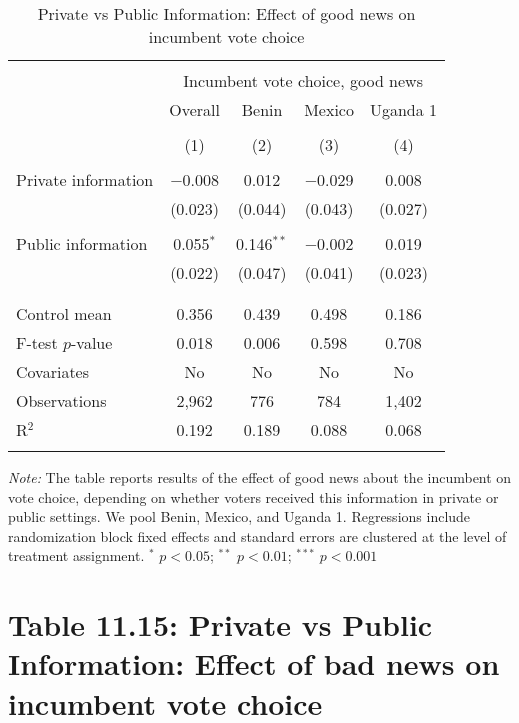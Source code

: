 \documentclass[]{article}
\begin{document}
\begin{table}[htb] \centering 
  \caption{Private vs Public Information: Effect of good news on incumbent vote choice} 
  \label{pvt_pub_good} 
\begin{tabular}{@{\extracolsep{5pt}}lcccc} 
\\[-1.8ex]\hline 
\hline \\[-1.8ex] 
 & \multicolumn{4}{c}{Incumbent vote choice, good news} \\ 
\cline{2-5} 
 & Overall & Benin & Mexico & Uganda 1 \\ 
\\[-1.8ex] & (1) & (2) & (3) & (4)\\ 
\hline \\[-1.8ex] 
 Private information & $-$0.008 & 0.012 & $-$0.029 & 0.008 \\ 
  & (0.023) & (0.044) & (0.043) & (0.027) \\ 
  & & & & \\ 
 Public information & 0.055$^{*}$ & 0.146$^{**}$ & $-$0.002 & 0.019 \\ 
  & (0.022) & (0.047) & (0.041) & (0.023) \\ 
  & & & & \\ 
\hline \\[-1.8ex] 
Control mean & 0.356 & 0.439 & 0.498 & 0.186 \\ 
F-test $p$-value & 0.018 & 0.006 & 0.598 & 0.708 \\ 
Covariates & No & No & No & No \\ 
Observations & 2,962 & 776 & 784 & 1,402 \\ 
R$^{2}$ & 0.192 & 0.189 & 0.088 & 0.068 \\ 
\hline 
\hline \\[-1.8ex] 
\end{tabular} 
\begin{flushleft}\textit{Note:} The table reports results of the effect of good news about the incumbent on vote choice, depending on whether voters received this information in private or public settings. We pool Benin, Mexico, and Uganda 1. Regressions include randomization block fixed effects and standard errors are clustered at the level of treatment assignment. $^*$ $p<0.05$; $^{**}$ $p<0.01$; $^{***}$ $p<0.001$ \end{flushleft}
\end{table}

\clearpage

\section{Table 11.15: Private vs Public Information: Effect of bad news
on incumbent vote
choice}\label{table-11.15-private-vs-public-information-effect-of-bad-news-on-incumbent-vote-choice}
\end{document}
